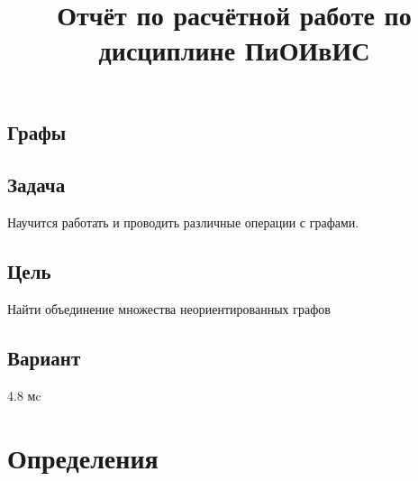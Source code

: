 \documentclass[12pt]{article}
\title{Отчёт по расчётной работе по дисциплине ПиОИвИС}
\author{}
\date{}
\begin{document}
\maketitle

\begin{center}
\section*{Графы}
\end{center}

\subsection*{Задача}
Научится работать и проводить различные операции с графами.

\subsection*{Цель}
Найти объединение множества неориентированных графов

\subsection*{Вариант}
4.8 мc

\section*{Определения}
\end{document}

